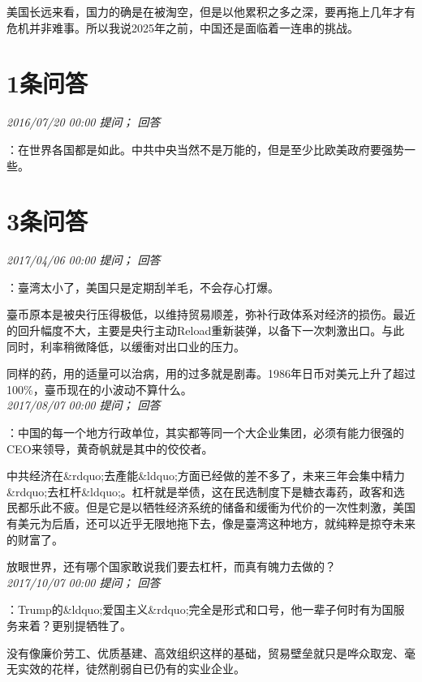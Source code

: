 \documentclass[twocolumn]{ctexart}
\begin{document}
美国长远来看，国力的确是在被淘空，但是以他累积之多之深，要再拖上几年才有危机并非难事。所以我说2025年之前，中国还是面临着一连串的挑战。\\

\section{1条问答}

\textit{\hfill\noindent\small 2016/07/20 00:00 提问； 回答}

：在世界各国都是如此。中共中央当然不是万能的，但是至少比欧美政府要强势一些。\\

\section{3条问答}

\textit{\hfill\noindent\small 2017/04/06 00:00 提问； 回答}

：臺湾太小了，美国只是定期刮羊毛，不会存心打爆。

臺币原本是被央行压得极低，以维持贸易顺差，弥补行政体系对经济的损伤。最近的回升幅度不大，主要是央行主动Reload重新装弹，以备下一次刺激出口。与此同时，利率稍微降低，以缓衝对出口业的压力。

同样的药，用的适量可以治病，用的过多就是剧毒。1986年日币对美元上升了超过100\%，臺币现在的小波动不算什么。\\

\textit{\hfill\noindent\small 2017/08/07 00:00 提问； 回答}

：中国的每一个地方行政单位，其实都等同一个大企业集团，必须有能力很强的CEO来领导，黄奇帆就是其中的佼佼者。

中共经济在\&rdquo;去產能\&ldquo;方面已经做的差不多了，未来三年会集中精力\&rdquo;去杠杆\&ldquo;。杠杆就是举债，这在民选制度下是糖衣毒药，政客和选民都乐此不疲。但是它是以牺牲经济系统的储备和缓衝为代价的一次性刺激，美国有美元为后盾，还可以近乎无限地拖下去，像是臺湾这种地方，就纯粹是掠夺未来的财富了。

放眼世界，还有哪个国家敢说我们要去杠杆，而真有魄力去做的？\\

\textit{\hfill\noindent\small 2017/10/07 00:00 提问； 回答}

：Trump的\&ldquo;爱国主义\&rdquo;完全是形式和口号，他一辈子何时有为国服务来着？更别提牺牲了。

没有像廉价劳工、优质基建、高效组织这样的基础，贸易壁垒就只是哗众取宠、毫无实效的花样，徒然削弱自已仍有的实业企业。
\end{document}
